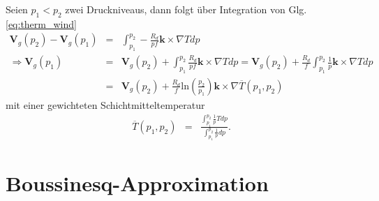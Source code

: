 \documentclass{book}
\newcommand\newoverline[1]{%
\overline{#1}}
\renewcommand{\ln}{\text{ln}}
\begin{document}
Seien $p_1 < p_2$ zwei Druckniveaus, dann folgt über Integration von Glg. \eqref{eq:therm_wind}
%
\begin{eqnarray}
\mathbf{V}_g\left(p_2\right) - \mathbf{V}_g\left(p_1\right) & = & \int_{p_1}^{p_2}-\frac{R_d}{pf}\mathbf{k}\times\nabla Tdp\nonumber\\
\Rightarrow\mathbf{V}_g\left(p_1\right) & = & \mathbf{V}_g\left(p_2\right) + \int_{p_1}^{p_2}\frac{R_d}{pf}\mathbf{k}\times\nabla Tdp = \mathbf{V}_g\left(p_2\right) + \frac{R_d}{f}\int_{p_1}^{p_2}\frac{1}{p}\mathbf{k}\times\nabla Tdp\nonumber\\
& = & \mathbf{V}_g\left(p_2\right) + \frac{R_d}{f}\ln\left(\frac{p_2}{p_1}\right)\mathbf{k}\times\nabla\newoverline{T}\left(p_1, p_2\right)
\end{eqnarray}
%
mit einer gewichteten Schichtmitteltemperatur
%
\begin{eqnarray}
\newoverline{T}\left(p_1, p_2\right) & = & \frac{\int_{p_1}^{p_2}\frac{1}{p}Tdp}{\int_{p_1}^{p_2}\frac{1}{p}dp}.
\end{eqnarray}

\section{Boussinesq-Approximation}
\label{sec:boussinesq-approximation}
\end{document}
